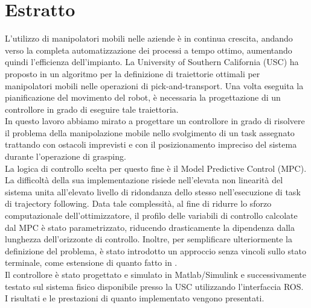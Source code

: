 	\newpage
\chapter*{Estratto}

L'utilizzo di manipolatori mobili nelle aziende è in continua crescita, andando verso la completa automatizzazione dei processi a tempo ottimo, aumentando quindi l'efficienza dell'impianto. La University of Southern California (USC) ha proposto in \cite{shantanuthakar} un algoritmo per la definizione di traiettorie ottimali per manipolatori mobili nelle operazioni di pick-and-transport. Una volta eseguita la pianificazione del movimento del robot, è necessaria la progettazione di un controllore in grado di eseguire tale traiettoria. \\
In questo lavoro abbiamo mirato a progettare un controllore in grado di risolvere il problema della manipolazione mobile nello svolgimento di un task assegnato trattando con ostacoli imprevisti e con il posizionamento impreciso del sistema durante l'operazione di grasping. \\La logica di controllo scelta per questo fine è il Model Predictive Control (MPC). La difficoltà della sua implementazione risiede nell'elevata non linearità del sistema unita all'elevato livello di ridondanza dello stesso nell'esecuzione di task di trajectory following. Data tale complessità, al fine di ridurre lo sforzo computazionale dell'ottimizzatore, il profilo delle variabili di controllo calcolate dal MPC è stato parametrizzato, riducendo drasticamente la dipendenza dalla lunghezza dell'orizzonte di controllo. Inoltre, per semplificare ulteriormente la definizione del problema, è stato introdotto un approccio senza vincoli sullo stato terminale, come estensione di quanto fatto in \cite{alamir2018stability}. \\
Il controllore è stato progettato e simulato in Matlab/Simulink e successivamente testato sul sistema fisico disponibile presso la USC utilizzando l'interfaccia ROS. I risultati e le prestazioni di quanto implementato vengono presentati.

\vspace{0.5cm}
\noindent 
